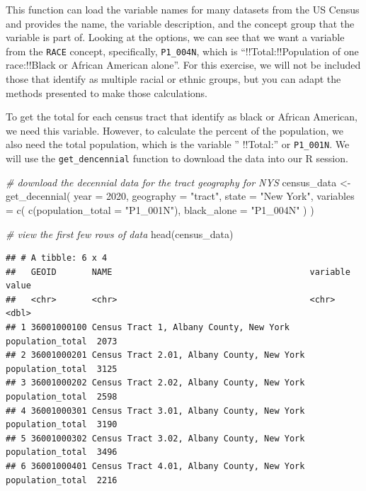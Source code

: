 \documentclass[
]{book}
\newenvironment{Shaded}{\begin{snugshade}}{\end{snugshade}}
\newcommand{\AttributeTok}[1]{\textcolor[rgb]{0.77,0.63,0.00}{#1}}
\newcommand{\CommentTok}[1]{\textcolor[rgb]{0.56,0.35,0.01}{\textit{#1}}}
\newcommand{\DecValTok}[1]{\textcolor[rgb]{0.00,0.00,0.81}{#1}}
\newcommand{\FunctionTok}[1]{\textcolor[rgb]{0.00,0.00,0.00}{#1}}
\newcommand{\NormalTok}[1]{#1}
\newcommand{\OtherTok}[1]{\textcolor[rgb]{0.56,0.35,0.01}{#1}}
\newcommand{\StringTok}[1]{\textcolor[rgb]{0.31,0.60,0.02}{#1}}
\begin{document}
This function can load the variable names for many datasets from the US Census and provides the name, the variable description, and the concept group that the variable is part of. Looking at the options, we can see that we want a variable from the \texttt{RACE} concept, specifically, \texttt{P1\_004N}, which is ``!!Total:!!Population of one race:!!Black or African American alone''. For this exercise, we will not be included those that identify as multiple racial or ethnic groups, but you can adapt the methods presented to make those calculations.

To get the total for each census tract that identify as black or African American, we need this variable. However, to calculate the percent of the population, we also need the total population, which is the variable '' !!Total:'' or \texttt{P1\_001N}. We will use the \texttt{get\_dencennial} function to download the data into our R session.

\begin{Shaded}
\begin{Highlighting}[]
\CommentTok{\# download the decennial data for the tract geography for NYS}
\NormalTok{census\_data }\OtherTok{\textless{}{-}} \FunctionTok{get\_decennial}\NormalTok{(}
  \AttributeTok{year =} \DecValTok{2020}\NormalTok{,}
  \AttributeTok{geography =} \StringTok{"tract"}\NormalTok{,}
  \AttributeTok{state =} \StringTok{"New York"}\NormalTok{,}
  \AttributeTok{variables =} \FunctionTok{c}\NormalTok{(}
    \FunctionTok{c}\NormalTok{(}\AttributeTok{population\_total =} \StringTok{"P1\_001N"}\NormalTok{),}
    \AttributeTok{black\_alone =} \StringTok{"P1\_004N"}
\NormalTok{  )}
\NormalTok{)}
\end{Highlighting}
\end{Shaded}

\begin{Shaded}
\begin{Highlighting}[]
\CommentTok{\# view the first few rows of data}
\FunctionTok{head}\NormalTok{(census\_data)}
\end{Highlighting}
\end{Shaded}

\begin{verbatim}
## # A tibble: 6 x 4
##   GEOID       NAME                                       variable         value
##   <chr>       <chr>                                      <chr>            <dbl>
## 1 36001000100 Census Tract 1, Albany County, New York    population_total  2073
## 2 36001000201 Census Tract 2.01, Albany County, New York population_total  3125
## 3 36001000202 Census Tract 2.02, Albany County, New York population_total  2598
## 4 36001000301 Census Tract 3.01, Albany County, New York population_total  3190
## 5 36001000302 Census Tract 3.02, Albany County, New York population_total  3496
## 6 36001000401 Census Tract 4.01, Albany County, New York population_total  2216
\end{verbatim}
\end{document}
